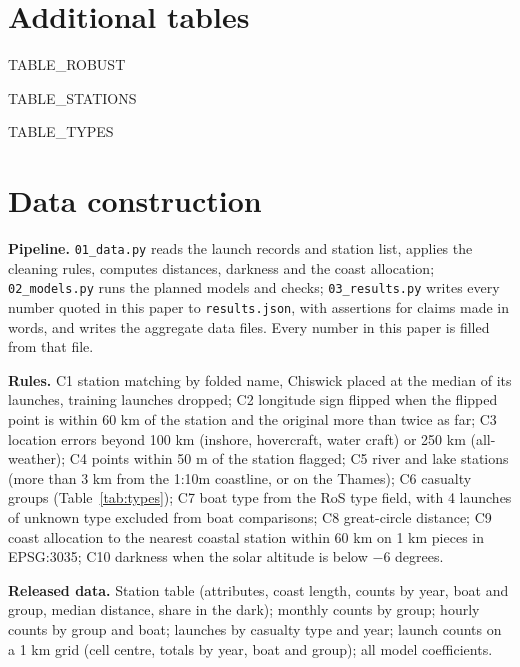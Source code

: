 \documentclass[11pt,a4paper]{article}
\begin{document}
\appendix
\section{Additional tables}
{{TABLE_ROBUST}}

{{TABLE_STATIONS}}

{{TABLE_TYPES}}

\section{Data construction}\label{app:data}
\textbf{Pipeline.} \texttt{01\_data.py} reads the launch records and station list, applies the cleaning rules, computes distances, darkness and the coast allocation; \texttt{02\_models.py} runs the planned models and checks; \texttt{03\_results.py} writes every number quoted in this paper to \texttt{results.json}, with assertions for claims made in words, and writes the aggregate data files. Every number in this paper is filled from that file.

\textbf{Rules.} C1 station matching by folded name, Chiswick placed at the median of its launches, training launches dropped; C2 longitude sign flipped when the flipped point is within 60 km of the station and the original more than twice as far; C3 location errors beyond 100 km (inshore, hovercraft, water craft) or 250 km (all-weather); C4 points within 50 m of the station flagged; C5 river and lake stations (more than 3 km from the 1:10m coastline, or on the Thames); C6 casualty groups (Table~\ref{tab:types}); C7 boat type from the RoS type field, with 4 launches of unknown type excluded from boat comparisons; C8 great-circle distance; C9 coast allocation to the nearest coastal station within 60 km on 1 km pieces in EPSG:3035; C10 darkness when the solar altitude is below $-6$ degrees.

\textbf{Released data.} Station table (attributes, coast length, counts by year, boat and group, median distance, share in the dark); monthly counts by group; hourly counts by group and boat; launches by casualty type and year; launch counts on a 1 km grid (cell centre, totals by year, boat and group); all model coefficients.
\end{document}
